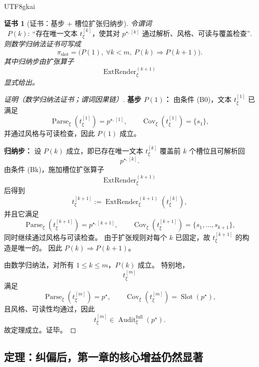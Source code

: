 \documentclass[12pt]{article}
\newtheorem{Certificate}{证书}[section]
\newcommand{\Parse}{\operatorname{Parse}}
\newcommand{\Audit}{\operatorname{Audit}}
\begin{document}
\begin{CJK*}{UTF8}{gkai}
\begin{Certificate}[证书：基步 + 槽位扩张归纳步]
\label{cert:tex37-ch5-slot-induction}
令谓词
\[
  P(k):\ \text{“存在唯一文本 }t_\xi^{[k]}\text{，使其对 }p^{\star,[k]}\text{ 通过解析、风格、可读与覆盖检查”}.
\]
则数学归纳法证书可写成
\[
  \pi_{\mathrm{slot}}
  =
  \bigl(
    P(1),\
    \forall k<m,\ P(k)\Rightarrow P(k+1)
  \bigr).
\]
其中归纳步由扩张算子
\[
  \operatorname{ExtRender}^{(k+1)}_\xi
\]
显式给出。
\end{Certificate}

\begin{proof}[证明（数学归纳法证书；谓词因果链）]
\textbf{基步 $P(1)$：}
由条件 \textnormal{(B0)}，文本 $t_\xi^{[1]}$ 已满足
\[
  \Parse_\xi(t_\xi^{[1]})=p^{\star,[1]},
  \qquad
  \operatorname{Cov}_\xi(t_\xi^{[1]})=\{s_1\},
\]
并通过风格与可读检查，因此 $P(1)$ 成立。

\textbf{归纳步：}
设 $P(k)$ 成立，即已存在唯一文本 $t_\xi^{[k]}$ 覆盖前 $k$ 个槽位且可解析回
\[
  p^{\star,[k]}.
\]
由条件 \textnormal{(Bk)}，施加槽位扩张算子
\[
  \operatorname{ExtRender}^{(k+1)}_\xi
\]
后得到
\[
  t_\xi^{[k+1]}
  :=
  \operatorname{ExtRender}^{(k+1)}_\xi(t_\xi^{[k]}),
\]
并且它满足
\[
  \Parse_\xi(t_\xi^{[k+1]})=p^{\star,[k+1]},
  \qquad
  \operatorname{Cov}_\xi(t_\xi^{[k+1]})=\{s_1,\dots,s_{k+1}\},
\]
同时继续通过风格与可读检查。
由于扩张规则对每个 $k$ 已固定，故 $t_\xi^{[k+1]}$ 的构造是唯一的。
因此 $P(k)\Rightarrow P(k+1)$。

由数学归纳法，对所有 $1\le k\le m$，$P(k)$ 成立。
特别地，
\[
  t_\xi^{[m]}
\]
满足
\[
  \Parse_\xi(t_\xi^{[m]})=p^\star,
  \qquad
  \operatorname{Cov}_\xi(t_\xi^{[m]})=\operatorname{Slot}(p^\star),
\]
且风格、可读性均通过，因此
\[
  t_\xi^{[m]}\in \Audit^{\mathrm{full}}_\xi(p^\star).
\]
故定理成立。证毕。
\end{proof}

\subsection{定理：纠偏后，第一章的核心增益仍然显著}
\label{subsec:tex37-ch5-gain}


\end{CJK*}
\end{document}

